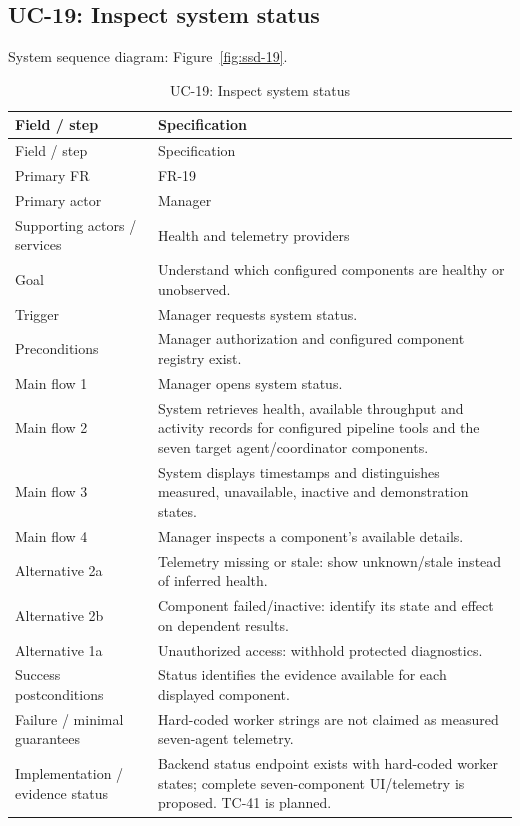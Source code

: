 \subsection*{UC-19: Inspect system status}
\label{uc:19}
System sequence diagram: Figure~\ref{fig:ssd-19}.

\begin{longtable}{P{0.23\textwidth}P{0.67\textwidth}}
\caption{UC-19: Inspect system status}\\
\toprule
Field / step & Specification\\
\midrule
\endfirsthead
\toprule
Field / step & Specification\\
\midrule
\endhead
Primary FR & FR-19\\
Primary actor & Manager\\
Supporting actors / services & Health and telemetry providers\\
Goal & Understand which configured components are healthy or unobserved.\\
Trigger & Manager requests system status.\\
Preconditions & Manager authorization and configured component registry exist.\\
Main flow 1 & Manager opens system status.\\
Main flow 2 & System retrieves health, available throughput and activity records for configured pipeline tools and the seven target agent/coordinator components.\\
Main flow 3 & System displays timestamps and distinguishes measured, unavailable, inactive and demonstration states.\\
Main flow 4 & Manager inspects a component's available details.\\
Alternative 2a & Telemetry missing or stale: show unknown/stale instead of inferred health.\\
Alternative 2b & Component failed/inactive: identify its state and effect on dependent results.\\
Alternative 1a & Unauthorized access: withhold protected diagnostics.\\
Success postconditions & Status identifies the evidence available for each displayed component.\\
Failure / minimal guarantees & Hard-coded worker strings are not claimed as measured seven-agent telemetry.\\
Implementation / evidence status & Backend status endpoint exists with hard-coded worker states; complete seven-component UI/telemetry is proposed. TC-41 is planned.\\
\bottomrule
\end{longtable}

